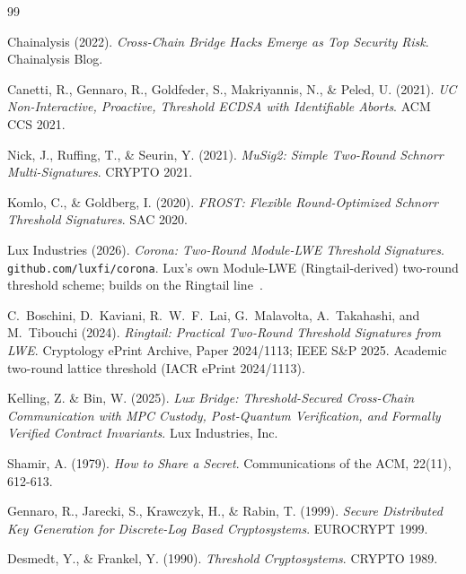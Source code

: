 \begin{thebibliography}{99}

Chainalysis (2022).
\textit{Cross-Chain Bridge Hacks Emerge as Top Security Risk}.
Chainalysis Blog.

Canetti, R., Gennaro, R., Goldfeder, S., Makriyannis, N., \& Peled, U. (2021).
\textit{UC Non-Interactive, Proactive, Threshold ECDSA with Identifiable Aborts}.
ACM CCS 2021.

Nick, J., Ruffing, T., \& Seurin, Y. (2021).
\textit{MuSig2: Simple Two-Round Schnorr Multi-Signatures}.
CRYPTO 2021.

Komlo, C., \& Goldberg, I. (2020).
\textit{FROST: Flexible Round-Optimized Schnorr Threshold Signatures}.
SAC 2020.

{Lux Industries} (2026).
\textit{Corona: Two-Round Module-LWE Threshold Signatures}.
\texttt{github.com/luxfi/corona}.
Lux's own Module-LWE (Ringtail-derived) two-round threshold scheme;
builds on the Ringtail line~\cite{ringtail}.

C.~Boschini, D.~Kaviani, R.~W.~F.~Lai, G.~Malavolta, A.~Takahashi, and
M.~Tibouchi (2024).
\textit{Ringtail: Practical Two-Round Threshold Signatures from LWE}.
Cryptology ePrint Archive, Paper 2024/1113; IEEE S\&P 2025.
Academic two-round lattice threshold (IACR ePrint 2024/1113).

Kelling, Z. \& Bin, W. (2025).
\textit{Lux Bridge: Threshold-Secured Cross-Chain Communication with MPC Custody, Post-Quantum Verification, and Formally Verified Contract Invariants}.
Lux Industries, Inc.

Shamir, A. (1979).
\textit{How to Share a Secret}.
Communications of the ACM, 22(11), 612-613.

Gennaro, R., Jarecki, S., Krawczyk, H., \& Rabin, T. (1999).
\textit{Secure Distributed Key Generation for Discrete-Log Based Cryptosystems}.
EUROCRYPT 1999.

Desmedt, Y., \& Frankel, Y. (1990).
\textit{Threshold Cryptosystems}.
CRYPTO 1989.

\end{thebibliography}

